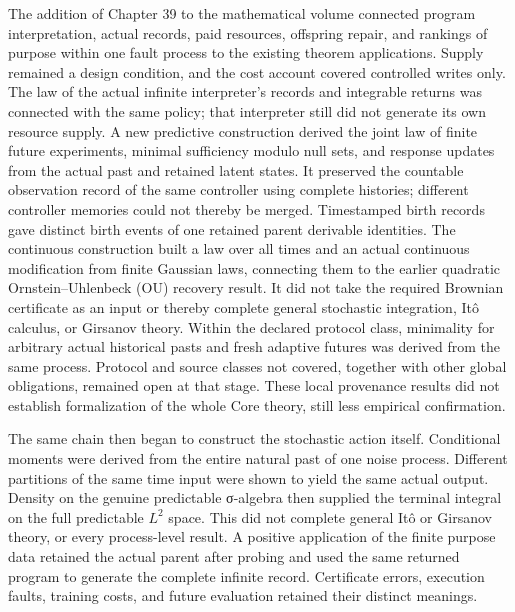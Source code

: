 \documentclass[
  english,
  11pt,
  oneside]{book}
\begin{document}
The addition of Chapter 39 to the mathematical volume connected program interpretation, actual records, paid resources, offspring repair, and rankings of purpose within one fault process to the existing theorem applications. Supply remained a design condition, and the cost account covered controlled writes only. The law of the actual infinite interpreter's records and integrable returns was connected with the same policy; that interpreter still did not generate its own resource supply. A new predictive construction derived the joint law of finite future experiments, minimal sufficiency modulo null sets, and response updates from the actual past and retained latent states. It preserved the countable observation record of the same controller using complete histories; different controller memories could not thereby be merged. Timestamped birth records gave distinct birth events of one retained parent derivable identities. The continuous construction built a law over all times and an actual continuous modification from finite Gaussian laws, connecting them to the earlier quadratic Ornstein--Uhlenbeck (OU) recovery result. It did not take the required Brownian certificate as an input or thereby complete general stochastic integration, Itô calculus, or Girsanov theory. Within the declared protocol class, minimality for arbitrary actual historical pasts and fresh adaptive futures was derived from the same process. Protocol and source classes not covered, together with other global obligations, remained open at that stage. These local provenance results did not establish formalization of the whole Core theory, still less empirical confirmation.

The same chain then began to construct the stochastic action itself. Conditional moments were derived from the entire natural past of one noise process. Different partitions of the same time input were shown to yield the same actual output. Density on the genuine predictable σ-algebra then supplied the terminal integral on the full predictable \(L^2\) space. This did not complete general Itô or Girsanov theory, or every process-level result. A positive application of the finite purpose data retained the actual parent after probing and used the same returned program to generate the complete infinite record. Certificate errors, execution faults, training costs, and future evaluation retained their distinct meanings.
\end{document}
